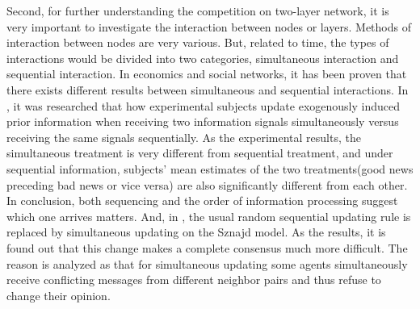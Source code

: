Second, for further understanding the competition on two-layer network, it is very important to investigate the interaction between nodes or layers. Methods of interaction between nodes are very various.\parencite{sirbu2017} But, related to time, the types of interactions  would be divided into two categories, simultaneous interaction and sequential interaction. In economics and social networks, it has been proven that there exists different results between simultaneous and sequential interactions.\parencite{hoffman2011, dietrich2004} In \parencite{hoffman2011}, it was researched that how experimental subjects update exogenously induced prior information when receiving two information signals simultaneously versus receiving the same signals sequentially. As the experimental results, the simultaneous treatment is very different from sequential treatment, and under sequential information,  subjects’ mean estimates of the two treatments(good news preceding bad news or vice versa) are also significantly different from each other. In conclusion, both sequencing and the order of information processing suggest which one arrives matters. And, in \parencite{dietrich2004}, the usual random sequential updating rule is replaced  by simultaneous updating on the Sznajd model. As the results, it is found out that this change makes a complete consensus much more difficult. The reason is analyzed as that for simultaneous updating some agents simultaneously receive conflicting messages from different neighbor pairs and thus refuse to change their opinion.

